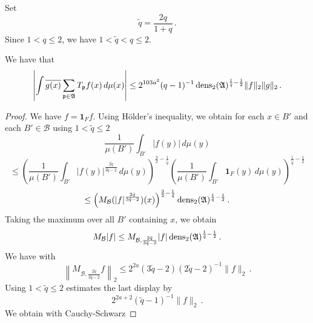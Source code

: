 Set
\begin{equation}
    \tilde{q}=\frac {2q}{1+q}\,.
\end{equation}
Since $1< q\le 2$, we have $1<\tilde{q}<q\le 2$.
\begin{lemma}
\label{dens2-antichain}
\leanok
{}
We have that
\begin{equation}\label{eqttt9}
  \left|\int \overline{g(x)} \sum_{{\mathfrak p} \in \mathfrak{A}} T_{{\mathfrak p}} f(x)\, d\mu(x)\right|\le
  2^{103a^3}({q}-1)^{-1} \operatorname{\operatorname{dens}}_2(\mathfrak{A})^{\frac 1{\tilde{q}}-\frac 12} \|f\|_2\|g\|_2\, .
\end{equation}
\end{lemma}
\begin{proof}
\leanok
We have $f=\mathbf{1}_Ff$. Using H\"older's inequality, we obtain for
each $x\in B'$ and each $B'\in \mathcal{B}$ using $1<\tilde{q}\le 2$
\begin{equation}
    \frac 1{\mu(B')}\int_{B'} |f(y)|\, d\mu(y)
\end{equation}
\begin{equation}
    \le
    \left(\frac 1{\mu(B')}\int_{B'} |f(y)|^{\frac {2{\tilde{q}}}{3\tilde{q}-2}}\, d\mu(y)\right)^{\frac 32-\frac 1{\tilde{q}}}
    \left(\frac 1{\mu(B')}\int_{B'} \mathbf{1}_F(y)\, d\mu(y)\right)^{\frac 1{\tilde{q}}-\frac 12}
\end{equation}
\begin{equation}
    \le \left(M_{\mathcal{B}} (|f|^{\frac {2{\tilde{q}}}{3{\tilde{q}}-2}})(x)\right)^{\frac 32-\frac 1{\tilde{q}}}
\operatorname{\operatorname{dens}}_2(\mathfrak{A})^{\frac 1{\tilde{q}}-\frac 12}\, .
\end{equation}
Taking the maximum over all $B'$ containing $x$, we obtain
\begin{equation} \label{eqttt1}
    M_{\mathcal{B}}|f|\le
    M_{\mathcal{B},\frac {2{\tilde{q}}}{3{\tilde{q}}-2} } |f|
    \operatorname{\operatorname{dens}}_2(\mathfrak{A})^{\frac 1{\tilde{q}}-\frac 12}\, .
\end{equation}
We have with 
\begin{equation}
\left\|M_{\mathcal{B}, \frac {2{\tilde{q}}}{3{\tilde{q}}-2}} f\right\|_2\le 2^{2a}(3\tilde{q}-2)(2\tilde{q}-2)^{-1}\|f\|_2\, .
\end{equation}
Using $1<\tilde{q}\le 2$ estimates the last display by
\begin{equation}\label{eqttt2}
 2^{2a+2} (\tilde{q}-1)^{-1} \|f\|_2\, .
\end{equation}
We obtain with Cauchy-Schwarz

\end{proof}
